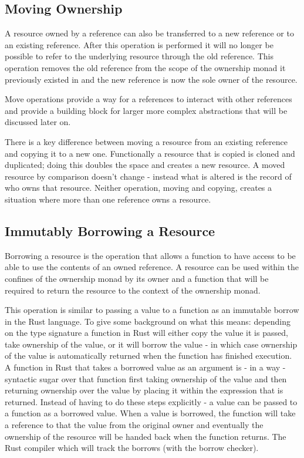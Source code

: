 \documentclass[onehalf,11pt]{beavtex}
\begin{document}
\subsection{Moving Ownership}

A resource owned by a reference can also be transferred to a new reference or
to an existing reference. After this operation is performed it will no longer
be possible to refer to the underlying resource through the old reference. This
operation removes the old reference from the scope of the ownership monad it
previously existed in and the new reference is now the sole owner of the
resource.

Move operations provide a way for a references to interact with
other references and provide a building block for larger more complex
abstractions that will be discussed later on.

There is a key difference between moving a resource from an existing reference
and copying it to a new one.  Functionally a resource that is copied is cloned
and duplicated; doing this doubles the space and creates a new resource.
A moved resource by comparison doesn't change - instead what is altered is the
record of who owns that resource.  Neither operation, moving and copying,
creates a situation where more than one reference owns a resource.

\subsection{Immutably Borrowing a Resource}

Borrowing a resource is the operation that allows a function to have
access to be able to use the contents of an owned reference.
A resource can be used within the confines of the ownership monad by its owner
and a function that will be required to return the resource to the context of
the ownership monad.

This operation is similar to passing a value to a function as an immutable
borrow in the Rust language.  To give some background on what this means:
depending on the type signature a function in Rust will either copy the value
it is passed, take ownership of the value, or it will borrow the value - in
which case ownership of the value is automatically returned when the function
has finished execution.\cite{rust_book_ownership}
A function in Rust that takes a borrowed value as an argument is - in a way -
syntactic sugar over that function first taking ownership of the value and then
returning ownership over the value by placing it within the expression that is
returned.
Instead of having to do these steps explicitly - a value can be passed to a
function as a borrowed value.  When a value is borrowed, the function will take
a reference to that the value from the original owner and eventually the
ownership of the resource will be handed back when the function returns.
The Rust compiler which will track the borrows (with the borrow checker).
\end{document}
